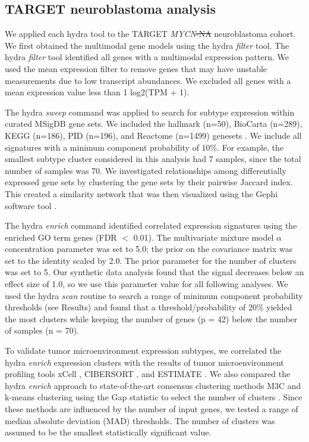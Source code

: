 \documentclass[10pt,letterpaper]{article}
\providecommand{\DIFaddtex}[1]{{\protect\color{blue}\uwave{#1}}} %
\providecommand{\DIFdeltex}[1]{{\protect\color{red}\sout{#1}}}                      %
\providecommand{\DIFaddbegin}{} %
\providecommand{\DIFaddend}{} %
\providecommand{\DIFdelbegin}{} %
\providecommand{\DIFdelend}{} %
\providecommand{\DIFadd}[1]{\texorpdfstring{\DIFaddtex{#1}}{#1}} %
\providecommand{\DIFdel}[1]{\texorpdfstring{\DIFdeltex{#1}}{}} %
\newcommand{\DIFscaledelfig}{0.5}
\newlength{\DIFdelgraphicswidth} %
\newlength{\DIFdelgraphicsheight} %
\newcommand{\DIFaddincludegraphics}[2][]{{\color{blue}\fbox{\DIFOincludegraphics[#1]{#2}}}} %
\newcommand{\DIFdelincludegraphics}[2][]{%
\sbox{\DIFdelgraphicsbox}{\DIFOincludegraphics[#1]{#2}}%
\settoboxwidth{\DIFdelgraphicswidth}{\DIFdelgraphicsbox} %
\settoboxtotalheight{\DIFdelgraphicsheight}{\DIFdelgraphicsbox} %
\scalebox{\DIFscaledelfig}{%
\parbox[b]{\DIFdelgraphicswidth}{\usebox{\DIFdelgraphicsbox}\\[-\baselineskip] \rule{\DIFdelgraphicswidth}{0em}}\llap{\resizebox{\DIFdelgraphicswidth}{\DIFdelgraphicsheight}{%
\setlength{\unitlength}{\DIFdelgraphicswidth}%
\begin{picture}(1,1)%
\thicklines\linethickness{2pt} %
{\color[rgb]{1,0,0}\put(0,0){\framebox(1,1){}}}%
{\color[rgb]{1,0,0}\put(0,0){\line( 1,1){1}}}%
{\color[rgb]{1,0,0}\put(0,1){\line(1,-1){1}}}%
\end{picture}%
}\hspace*{3pt}}} %
} %
\DeclareRobustCommand{\DIFaddbegin}{\DIFOaddbegin \let\includegraphics\DIFaddincludegraphics} %
\DeclareRobustCommand{\DIFaddend}{\DIFOaddend \let\includegraphics\DIFOincludegraphics} %
\DeclareRobustCommand{\DIFdelbegin}{\DIFOdelbegin \let\includegraphics\DIFdelincludegraphics} %
\DeclareRobustCommand{\DIFdelend}{\DIFOaddend \let\includegraphics\DIFOincludegraphics} %
\begin{document}
\subsection*{TARGET neuroblastoma analysis}
We applied each hydra tool to the TARGET \textit{MYCN}\DIFdelbegin \DIFdel{-NA }\DIFdelend \DIFaddbegin \DIFadd{-non-amplified }\DIFaddend neuroblastoma cohort. We first obtained the multimodal gene models using the hydra \textit{filter} tool. The hydra \textit{filter} tool identified all genes with a multimodal expression pattern. We used the mean expression filter to remove genes that may have unstable measurements due to low transcript abundances. We excluded all genes with a mean expression value less than 1 log2(TPM + 1).

The hydra \textit{sweep} command was applied to search for subtype expression within curated MSigDB gene sets. We included the hallmark (n=50), BioCarta (n=289), KEGG (n=186), PID (n=196), and Reactome (n=1499) genesets \cite{liberzonMolecularSignaturesDatabase2011}. We include all signatures with a minimum component probability of 10\%. For example, the smallest subtype cluster considered in this analysis had 7 samples, since the total number of samples was 70. We investigated relationships among differentially expressed gene sets by clustering the gene sets by their pairwise Jaccard index. This created a similarity network that was then visualized using the Gephi software tool \cite{bastian2009gephi}.

The hydra \textit{enrich} command identified correlated expression signatures using the enriched GO term genes (FDR $<$ 0.01). The multivariate mixture model $\alpha$ concentration parameter was set to 5.0; the prior on the covariance matrix was set to the identity scaled by 2.0. The prior parameter for the number of clusters was set to 5. Our synthetic data analysis found that the signal decreases below an effect size of 1.0, so we use this parameter value for all following analyses. We used the hydra \textit{scan} routine to search a range of minimum component probability thresholds (see Results) and found that a threshold/probability of 20\% yielded the most clusters while keeping the number of genes (p = 42) below the number of samples (n = 70).

To validate tumor microenvironment expression subtypes, we correlated the hydra \textit{enrich} expression clusters with the results of tumor microenvironment profiling tools xCell \cite{aranXCellDigitallyPortraying2017}, CIBERSORT \cite{newmanRobustEnumerationCell2015}, and ESTIMATE \cite{yoshiharaInferringTumourPurity2013a}. We also compared the hydra \textit{enrich} approach to state-of-the-art consensus clustering methods M3C \cite{johnM3CMonteCarlo2018} and k-means clustering using the Gap statistic to select the number of clusters \cite{tibshirani2001estimating}. Since these methods are influenced by the number of input genes, we tested a range of median absolute deviation (MAD) thresholds. The number of clusters was assumed to be the smallest statistically significant value.
\end{document}
